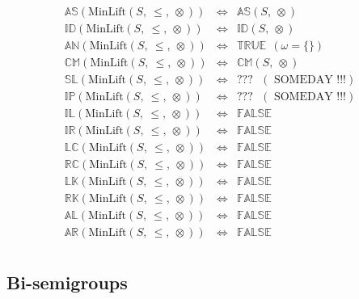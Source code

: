 \documentclass[10pt]{article}
\newcommand{\propname}[1]{{\mathbb{#1}}}
\begin{document}
\[
\begin{array}{rcl} 
\propname{AS}(\mathrm{MinLift}(S,\ \leq,\ \otimes)) 
  & \Leftrightarrow 
  & \propname{AS}(S,\ \otimes)
  \\ 
\propname{ID}(\mathrm{MinLift}(S,\ \leq,\ \otimes)) 
  & \Leftrightarrow 
  & \propname{ID}(S,\ \otimes)
  \\ 
\propname{AN}(\mathrm{MinLift}(S,\ \leq,\ \otimes)) 
  & \Leftrightarrow 
  & \propname{TRUE} \ \ (\omega = \{\})
  \\ 
\propname{CM}(\mathrm{MinLift}(S,\ \leq,\ \otimes)) 
  & \Leftrightarrow 
  & \propname{CM}(S,\ \otimes)
  \\ 
\propname{SL}(\mathrm{MinLift}(S,\ \leq,\ \otimes)) 
  & \Leftrightarrow 
  & ??? \ \ \ (\mbox{  SOMEDAY !!!})
  \\ 
\propname{IP}(\mathrm{MinLift}(S,\ \leq,\ \otimes)) 
  & \Leftrightarrow
  & ??? \ \ \ (\mbox{  SOMEDAY !!!})
  \\ 
\propname{IL}(\mathrm{MinLift}(S,\ \leq,\ \otimes)) 
  & \Leftrightarrow 
  & \propname{FALSE} 
  \\ 
\propname{IR}(\mathrm{MinLift}(S,\ \leq,\ \otimes)) 
  & \Leftrightarrow 
  & \propname{FALSE} 
  \\ 
\propname{LC}(\mathrm{MinLift}(S,\ \leq,\ \otimes)) 
  & \Leftrightarrow 
  & \propname{FALSE} 
  \\ 
\propname{RC}(\mathrm{MinLift}(S,\ \leq,\ \otimes)) 
  & \Leftrightarrow 
  & \propname{FALSE} 
  \\ 
\propname{LK}(\mathrm{MinLift}(S,\ \leq,\ \otimes)) 
  & \Leftrightarrow 
  & \propname{FALSE} 
  \\ 
\propname{RK}(\mathrm{MinLift}(S,\ \leq,\ \otimes)) 
  & \Leftrightarrow 
  & \propname{FALSE} 
  \\ 
\propname{AL}(\mathrm{MinLift}(S,\ \leq,\ \otimes))  
  & \Leftrightarrow 
  &  \propname{FALSE} 
  \\ 
\propname{AR}(\mathrm{MinLift}(S,\ \leq,\ \otimes))  
  & \Leftrightarrow 
  & \propname{FALSE}  
  \\ 
\end{array} 
\] 


\subsection{Bi-semigroups}
\end{document}
